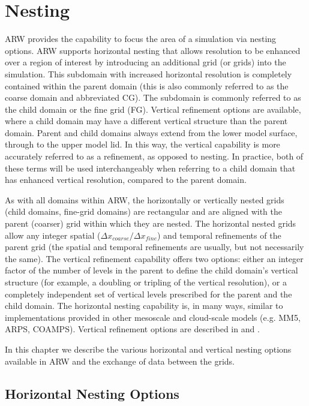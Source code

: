 \chapter{Nesting}
\label{nesting_chap}

ARW provides the capability to focus the area of a simulation
via nesting options. 
ARW supports horizontal nesting that allows resolution to be
enhanced over a region of interest by introducing an additional grid (or
grids) into the simulation.  This subdomain with increased horizontal resolution is completely
contained within the parent domain (this is also commonly referred to as the
coarse domain and abbreviated CG). 
The subdomain is commonly referred to as the child domain or the fine grid (FG).
Vertical refinement options are
available, where a child domain may have a different vertical structure than
the parent domain. Parent and child domains always extend from the lower model surface,
through to the upper model lid. In this way, the vertical capability is more accurately referred
to as a refinement, as opposed to nesting. In practice, both of these terms will be used 
interchangeably when referring to a child domain that has enhanced vertical resolution, 
compared to the parent domain.

As with all domains within ARW, the horizontally or vertically nested grids (child domains, 
fine-grid domains) are rectangular
and are aligned with the parent (coarser) grid within which they are
nested.  
The horizontal nested grids allow any integer spatial
($\Delta x_{coarse}/\Delta x_{fine}$) 
and temporal refinements of the
parent grid (the spatial and temporal refinements are usually,
but not necessarily the same).  
The vertical refinement capability offers two options: either an integer factor of the
number of levels in the parent to define the child domain's vertical structure (for example, 
a doubling or tripling of the vertical resolution), or a completely independent set of 
vertical levels prescribed for the parent and the child domain.
The horizontal nesting capability is, in many ways, similar to
implementations provided in other mesoscale and cloud-scale models (e.g. MM5,
ARPS, COAMPS). Vertical refinement options are described in 
\citet{mahalovmoustaoui09} and \citet{daniels16}.

In this chapter we
describe the various horizontal and vertical nesting options available in ARW and the 
exchange of data between the grids.

\section {Horizontal Nesting Options}

